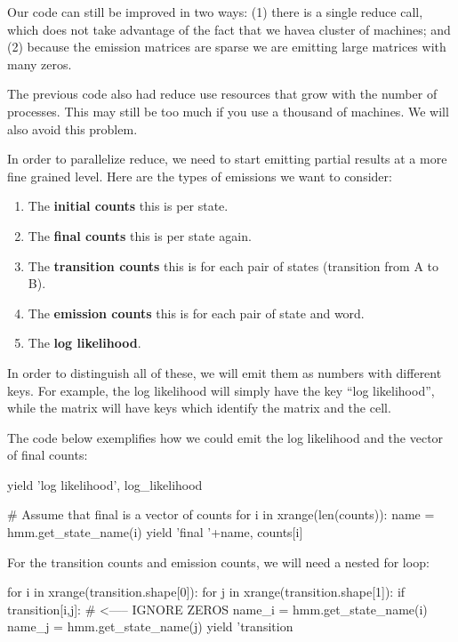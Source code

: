 Our code can still be improved in two ways: (1) there is a single reduce call,
which does not take advantage of the fact that we havea cluster of machines;
and (2) because the emission matrices are sparse we are emitting large matrices
with many zeros. %

The previous code also had reduce use resources that grow with the number of
processes. This may still be too much if you use a thousand of machines. We
will also avoid this problem.

In order to parallelize reduce, we need to start emitting partial results at a
more fine grained level. Here are the types of emissions we want to consider:

\begin{enumerate}
\item The \textbf{initial counts} this is per state.
\item The \textbf{final counts} this is per state again.
\item The \textbf{transition counts} this is for each pair of states (transition from A to B).
\item The \textbf{emission counts} this is for each pair of state and word.
\item The \textbf{log likelihood}.
\end{enumerate}

In order to distinguish all of these, we will emit them as numbers with
different keys. For example, the log likelihood will simply have the key ``log
likelihood'', while the matrix will have keys which identify the matrix and the
cell.

The code below exemplifies how we could emit the log likelihood and the vector
of final counts:

\begin{python}
yield 'log likelihood', log_likelihood

# Assume that final is a vector of counts
for i in xrange(len(counts)):
    name = hmm.get_state_name(i)
    yield 'final '+name, counts[i]
\end{python} %

For the transition counts and emission counts, we will need a nested for loop:

\begin{python}
for i in xrange(transition.shape[0]):
    for j in xrange(transition.shape[1]):
        if transition[i,j]: # <----- IGNORE ZEROS
            name_i = hmm.get_state_name(i)
            name_j = hmm.get_state_name(j)
            yield 'transition %
\end{python}

